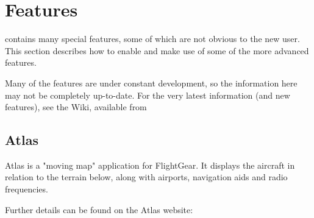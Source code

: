 
\chapter{Features\label{features}}

\FlightGear{} contains many special features, some of which are not obvious to the new user. This section
describes how to enable and make use of some of the more advanced features. 

Many of the features are under constant development, so the information here may not be completely up-to-date.
For the very latest information (and new features), see the \FlightGear{} Wiki, available from

\noindent
{}

\section{Atlas}

Atlas is a "moving map" application for FlightGear. It displays the aircraft in relation to the terrain below, along with airports, navigation aids and radio frequencies. 

Further details can be found on the Atlas website:

\noindent
{}

